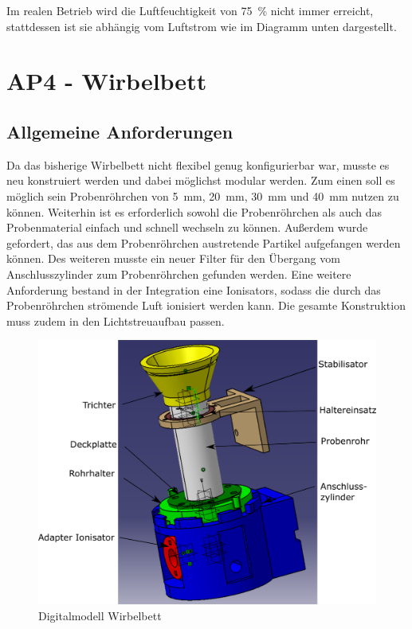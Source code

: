 Im realen Betrieb wird die Luftfeuchtigkeit von \SI{75}{\%} nicht immer erreicht, stattdessen ist sie abhängig vom Luftstrom wie im Diagramm unten dargestellt.



\newpage

\section{AP4 - Wirbelbett}


\subsection{Allgemeine Anforderungen}

Da das bisherige Wirbelbett nicht flexibel genug konfigurierbar war, musste es neu konstruiert werden und dabei möglichst modular werden. Zum einen soll es möglich sein Probenröhrchen von \SI{5}{mm}, \SI{20}{mm}, \SI{30}{mm} und \SI{40}{mm} nutzen zu können. Weiterhin ist es erforderlich sowohl die Probenröhrchen als auch das Probenmaterial einfach und schnell wechseln zu können. Außerdem wurde gefordert, das aus dem Probenröhrchen austretende Partikel aufgefangen werden können. Des weiteren musste ein neuer Filter für den Übergang vom Anschlusszylinder zum Probenröhrchen gefunden werden. 
Eine weitere Anforderung bestand in der Integration eine Ionisators, sodass die durch das Probenröhrchen strömende Luft ionisiert werden kann. Die gesamte Konstruktion muss zudem in den Lichtstreuaufbau passen. \\




\begin{figure}[h]
	\begin{center}
		\includegraphics[scale=0.6]{Zusammenbau_fluides_Bett.png}
		\caption{Digitalmodell Wirbelbett}
	\end{center}
\end{figure}


